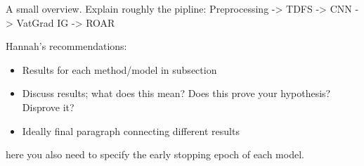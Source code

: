A small overview. Explain roughly the pipline: Preprocessing -> TDFS -> CNN -> VatGrad IG -> ROAR

Hannah's recommendations:
\begin{itemize}
  \item Results for each method/model in subsection
  \item Discuss results; what does this mean? Does this prove your hypothesis? Disprove it?
  \item Ideally final paragraph connecting different results
\end{itemize}

here you also need to specify the early stopping epoch of each model.
